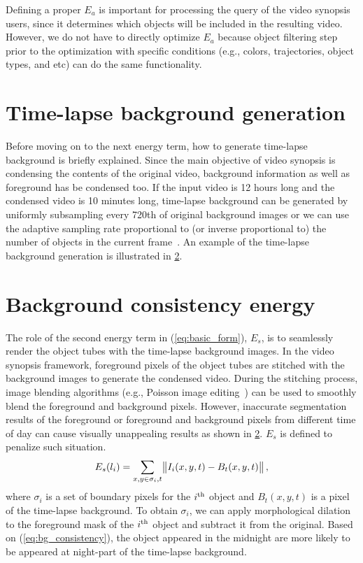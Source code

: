 \documentclass[11pt]{hyu_thesis}
\begin{document}
Defining a proper $E_a$ is important for processing the query of the video synopsis users, since it determines which objects will be included in the resulting video. However, we do not have to directly optimize $E_a$ because object filtering step prior to the optimization with specific conditions (e.g., colors, trajectories, object types, and etc) can do the same functionality.

\section{Time-lapse background generation}
Before moving on to the next energy term, how to generate time-lapse background is briefly explained. Since the main objective of video synopsis is condensing the contents of the original video, background information as well as foreground has be condensed too. If the input video is 12 hours long and the condensed video is 10 minutes long, time-lapse background can be generated by uniformly subsampling every 720th of original background images or we can use the adaptive sampling rate proportional to (or inverse proportional to) the number of objects in the current frame~\cite{Pritch2008}. An example of the time-lapse background generation is illustrated in \ref{}.

\section{Background consistency energy}
The role of the second energy term in (\ref{eq:basic_form}), $E_s$, is to seamlessly render the object tubes with the time-lapse background images. In the video synopsis framework, foreground pixels of the object tubes are stitched with the background images to generate the condensed video. During the stitching process, image blending algorithms (e.g., Poisson image editing~\cite{Perez2003}) can be used to smoothly blend the foreground and background pixels. However, inaccurate segmentation results of the foreground or foreground and background pixels from different time of day can cause visually unappealing results as shown in \ref{}. $E_s$ is defined to penalize such situation.
\begin{equation}
\label{eq:bg_consistency}
E_s(l_i)=\sum_{x,y \in \sigma_i,t}\norm{I_i(x,y,t)-B_t(x,y,t)},
\end{equation}
where $\sigma_i$ is a set of boundary pixels for the $i^{\rm{th}}$ object and $B_t(x,y,t)$ is a pixel of the time-lapse background. To obtain $\sigma_i$, we can apply morphological dilation to the foreground mask of the $i^{\rm{th}}$ object and subtract it from the original. Based on (\ref{eq:bg_consistency}), the object appeared in the midnight are more likely to be appeared at night-part of the time-lapse background.
\end{document}
